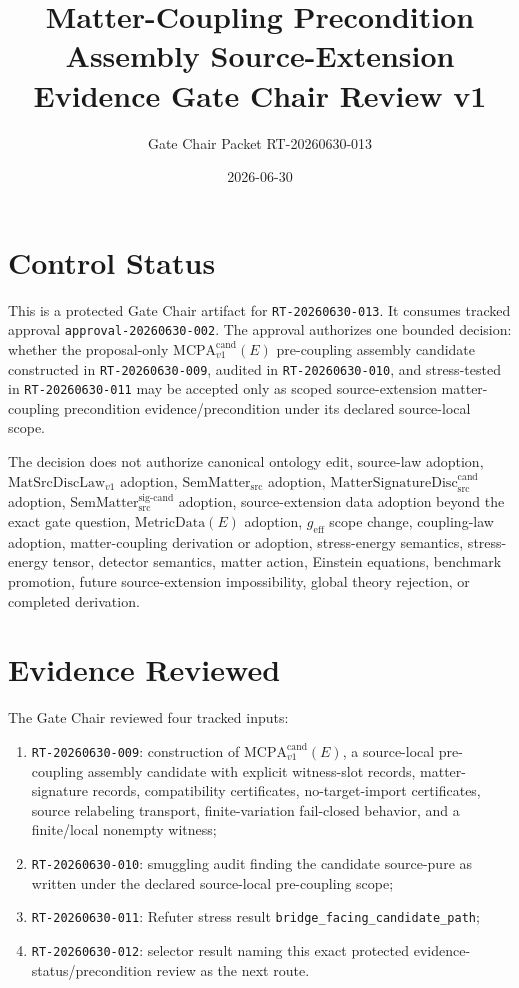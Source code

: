 \documentclass[11pt]{article}
\title{Matter-Coupling Precondition Assembly Source-Extension Evidence Gate Chair Review v1}
\author{Gate Chair Packet RT-20260630-013}
\date{2026-06-30}
\newcommand{\MetricData}{\mathrm{MetricData}}
\newcommand{\geff}{g_{\mathrm{eff}}}
\newcommand{\MatSrcDiscLaw}{\mathrm{MatSrcDiscLaw}_{v1}}
\newcommand{\SemMatterSrc}{\mathrm{SemMatter}_{\mathrm{src}}}
\newcommand{\SemMatterSig}{\mathrm{SemMatter}_{\mathrm{src}}^{\mathrm{sig\text{-}cand}}}
\newcommand{\MatSigDisc}{\mathrm{MatterSignatureDisc}_{\mathrm{src}}^{\mathrm{cand}}}
\newcommand{\MCPACand}{\mathrm{MCPA}^{\mathrm{cand}}_{v1}}
\begin{document}
\maketitle

\section{Control Status}

This is a protected Gate Chair artifact for \texttt{RT-20260630-013}. It
consumes tracked approval \texttt{approval-20260630-002}. The approval
authorizes one bounded decision: whether the proposal-only
\(\MCPACand(E)\) pre-coupling assembly candidate constructed in
\texttt{RT-20260630-009}, audited in \texttt{RT-20260630-010}, and
stress-tested in \texttt{RT-20260630-011} may be accepted only as scoped
source-extension matter-coupling precondition evidence/precondition under its
declared source-local scope.

The decision does not authorize canonical ontology edit, source-law adoption,
\(\MatSrcDiscLaw\) adoption, \(\SemMatterSrc\) adoption, \(\MatSigDisc\)
adoption, \(\SemMatterSig\) adoption, source-extension data adoption beyond
the exact gate question, \(\MetricData(E)\) adoption, \(\geff\) scope change,
coupling-law adoption, matter-coupling derivation or adoption, stress-energy
semantics, stress-energy tensor, detector semantics, matter action, Einstein
equations, benchmark promotion, future source-extension impossibility, global
theory rejection, or completed derivation.

\section{Evidence Reviewed}

The Gate Chair reviewed four tracked inputs:

\begin{enumerate}[label=(\alph*)]
  \item \texttt{RT-20260630-009}: construction of
  \(\MCPACand(E)\), a source-local pre-coupling assembly candidate with
  explicit witness-slot records, matter-signature records, compatibility
  certificates, no-target-import certificates, source relabeling transport,
  finite-variation fail-closed behavior, and a finite/local nonempty witness;
  \item \texttt{RT-20260630-010}: smuggling audit finding the candidate
  source-pure as written under the declared source-local pre-coupling scope;
  \item \texttt{RT-20260630-011}: Refuter stress result
  \texttt{bridge\_facing\_candidate\_path};
  \item \texttt{RT-20260630-012}: selector result naming this exact protected
  evidence-status/precondition review as the next route.
\end{enumerate}
\end{document}
